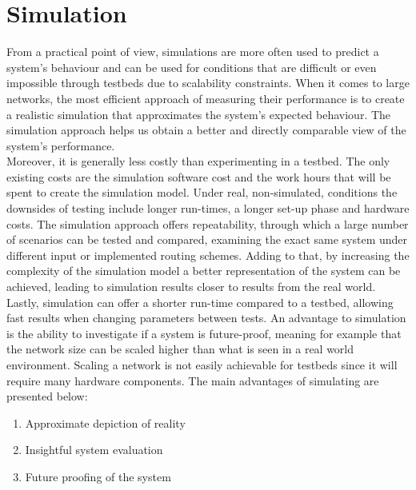\section{Simulation}
\label{sec:simulation}


From a practical point of view, simulations are more often used to predict a system's behaviour and can be used for conditions that are difficult or even impossible through testbeds due to scalability constraints. When it comes to large networks, the most efficient approach of measuring their performance is to create a realistic simulation that approximates the system's expected behaviour. The simulation approach helps us obtain a better and directly comparable view of the system's performance.\\
Moreover, it is generally less costly than experimenting in a testbed. The only existing costs are the simulation software cost and the work hours that will be spent to create the simulation model. Under real, non-simulated, conditions the downsides of testing include longer run-times, a longer set-up phase and hardware costs. The simulation approach offers repeatability, through which a large number of scenarios can be tested and compared, examining the exact same system under different input or implemented routing schemes. Adding to that, by increasing the complexity of the simulation model a better representation of the system can be achieved, leading to simulation results closer to results from the real world. Lastly, simulation can offer a shorter run-time compared to a testbed, allowing fast results when changing parameters between tests. An advantage to simulation is the ability to investigate if a system is future-proof, meaning for example that the network size can be scaled higher than what is seen in a real world environment. Scaling a network is not easily achievable for testbeds since it will require many hardware components. The main advantages of simulating are presented below:

\begin{enumerate}
\item Approximate depiction of reality
\item Insightful system evaluation
\item Future proofing of the system
\end{enumerate}

